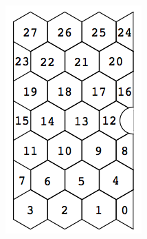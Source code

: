\begin{figure}[htbp]
	\begin{center}
		\begin{subfigure}[b]{0.35\textwidth}
			\includegraphics[width=\textwidth]{Chapters/detector/rich/mirror_segmentation_rich2_spherical.png}		
			\caption{}
			\label{}
		\end{subfigure}
		\begin{subfigure}[b]{0.35\textwidth}

\end{subfigure}
\end{center}
\end{figure}
